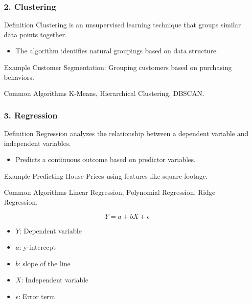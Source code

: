 \documentclass{beamer}
\begin{document}
\begin{frame}[fragile]
    \frametitle{2. Clustering}
    \begin{block}{Definition}
        Clustering is an unsupervised learning technique that groups similar data points together.
    \end{block}
    \begin{itemize}
        \item The algorithm identifies natural groupings based on data structure.
    \end{itemize}
    \begin{block}{Example}
        Customer Segmentation: Grouping customers based on purchasing behaviors.
    \end{block}
    \begin{block}{Common Algorithms}
        K-Means, Hierarchical Clustering, DBSCAN.
    \end{block}
\end{frame}

\begin{frame}[fragile]
    \frametitle{3. Regression}
    \begin{block}{Definition}
        Regression analyzes the relationship between a dependent variable and independent variables.
    \end{block}
    \begin{itemize}
        \item Predicts a continuous outcome based on predictor variables.
    \end{itemize}
    \begin{block}{Example}
        Predicting House Prices using features like square footage.
    \end{block}
    \begin{block}{Common Algorithms}
        Linear Regression, Polynomial Regression, Ridge Regression.
    \end{block}
    \begin{equation}
    Y = a + bX + \epsilon
    \end{equation}
    \begin{itemize}
        \item $Y$: Dependent variable
        \item $a$: y-intercept
        \item $b$: slope of the line
        \item $X$: Independent variable
        \item $\epsilon$: Error term
    \end{itemize}
\end{frame}
\end{document}
